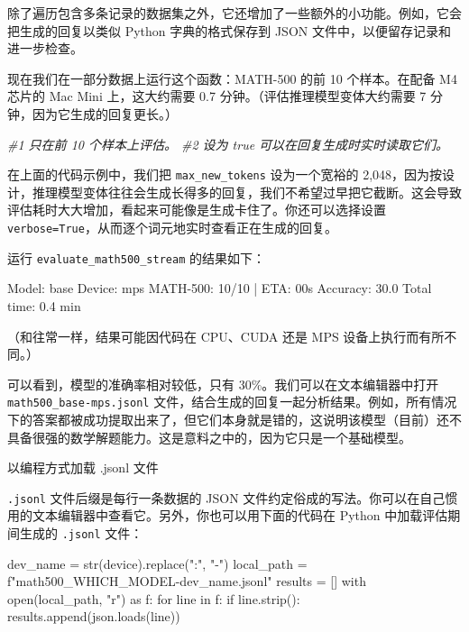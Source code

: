 除了遍历包含多条记录的数据集之外，它还增加了一些额外的小功能。例如，它会把生成的回复以类似 Python 字典的格式保存到 JSON 文件中，以便留存记录和进一步检查。

现在我们在一部分数据上运行这个函数：MATH-500 的前 10 个样本。在配备 M4 芯片的 Mac Mini 上，这大约需要 0.7 分钟。（评估推理模型变体大约需要 7 分钟，因为它生成的回复更长。）

{\noindent\small\textit{\#1 只在前 10 个样本上评估。 \newline \#2 设为 true 可以在回复生成时实时读取它们。}\par}

在上面的代码示例中，我们把 \texttt{max\_new\_tokens} 设为一个宽裕的 2,048，因为按设计，推理模型变体往往会生成长得多的回复，我们不希望过早把它截断。这会导致评估耗时大大增加，看起来可能像是生成卡住了。你还可以选择设置 \texttt{verbose=True}，从而逐个词元地实时查看正在生成的回复。

运行 \texttt{evaluate\_math500\_stream} 的结果如下：

\begin{codebox}
Model: base
Device: mps
MATH-500: 10/10 | ETA: 00s
Accuracy: 30.0%
Total time: 0.4 min
\end{codebox}

（和往常一样，结果可能因代码在 CPU、CUDA 还是 MPS 设备上执行而有所不同。）

可以看到，模型的准确率相对较低，只有 30\%。我们可以在文本编辑器中打开 \texttt{math500\_base-mps.jsonl} 文件，结合生成的回复一起分析结果。例如，所有情况下的答案都被成功提取出来了，但它们本身就是错的，这说明该模型（目前）还不具备很强的数学解题能力。这是意料之中的，因为它只是一个基础模型。

\begin{mySidebar}{以编程方式加载 .jsonl 文件}

\texttt{.jsonl} 文件后缀是每行一条数据的 JSON 文件约定俗成的写法。你可以在自己惯用的文本编辑器中查看它。另外，你也可以用下面的代码在 Python 中加载评估期间生成的 \texttt{.jsonl} 文件：

\begin{codebox}
dev_name = str(device).replace(":", "-")
local_path = f"math500_{WHICH_MODEL}-{dev_name}.jsonl"
results = []
with open(local_path, "r") as f:
    for line in f:
        if line.strip():
            results.append(json.loads(line))
\end{codebox}

\end{mySidebar}

